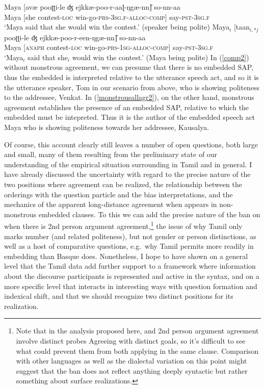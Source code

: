 \documentclass[output=paper, modfonts, nonflat]{langsci/langscibook}
\begin{document}
\ea\label{monnomon}
 \ea\label{comp2}\gll Maya [avæ{} pooʈʈi-le ʤ
 ejkkæ-poo-r-aaɭ-ŋgæ-nn\U] so-nn-aa\\  
 Maya [she contest-\textsc{loc}{} win-go-\textsc{prs}-3\textsc{sg.f}-\textsc{alloc}-\textsc{comp}]
 say-\textsc{pst}-3\textsc{sg.f}\\ 
 \glt `Maya said that she would win the contest.' (speaker being polite)
 \ex\label{monstrousallagr2}\gll Maya$_i$ [taan$_{i,*j}$ pooʈʈi-le ʤ
 ejkkæ-poo-r-een-ŋgæ-nn\U] so-nn-aa\\  
 Maya [\textsc{anaph} contest-\textsc{loc}{} win-go-\textsc{prs}-1\textsc{sg}-\textsc{alloc}-\textsc{comp}]
 say-\textsc{pst}-3\textsc{sg.f}\\ \vspace{-0.25cm}
 \glt `Maya$_i$ said that she$_i$ would win the contest.' (Maya being polite)
 \z
\z
%
In (\ref{comp2}) without monstrous agreement, we can presume that
there is no embedded SAP, thus the embedded \allagr{} is interpreted
relative to the utterance speech act, and so it is the utterance
speaker, Tom in our scenario from above, who is showing politeness to
the addressee, Venkat. In (\ref{monstrousallagr2}), on the other hand,
monstrous agreement establishes the presence of an embedded SAP,
relative to which the embedded \allagr{} must be intepreted. Thus it
is the author of the embedded speech act Maya who is showing
politeness towards her addressee, Kausalya.

Of course, this account clearly still leaves a number of open
questions, both large and small, many of them resulting from the
preliminary state of our understanding of the empirical situation
surrounding \allagr{} in Tamil and in general. I have already
discussed the uncertainty with regard to the precise nature of the two
positions where agreement can be realized, the relationship between
the orderings with the question particle and the bias interpretations,
and the mechanics of the apparent long-distance agreement when
\allagr{} appears in non-monstrous embedded clauses. To this we can
add the precise nature of the ban on \allagr{} when there is 2nd
person argument agreement,\footnote{Note that in the analysis proposed
  here, \allagr{} and 2nd person argument agreement involve distinct
  probes Agreeing with distinct goals, so it's difficult to see what
  could prevent them from both applying in the same clause. Comparison
  with other languages as well as the dialectal variation on this
  point might suggest that the ban does not reflect anything deeply
  syntactic but rather something about surface realizations.} the
issue of why Tamil \allagr{} only marks number (and related
politeness), but not gender or person distinctions, as well as a host
of comparative questions, e.g.\ why Tamil permits \allagr{} more
readily in embedding than Basque does. Nonetheless, I hope to have
shown on a general level that the Tamil data add further support to a
framework where information about the discourse participants is
represented and active in the syntax, and on a more specific level
that \allagr{} interacts in interesting ways with question formation
and indexical shift, and that we should recognize two distinct
positions for its realization.
\newpage
\end{document}
